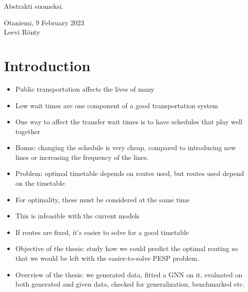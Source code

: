 \documentclass[english, 12pt, a4paper, sci, utf8, a-2b, online]{aaltothesis}
\date{9 February 2023}
\begin{document}
\makecoverpage
\makecopyrightpage
\clearpage

\begin{abstractpage}[english]
    \abstracttext{}
\end{abstractpage}


\newpage
{}
\date{9.2.2023}
\begin{abstractpage}[finnish]
    Abstrakti suomeksi.
\end{abstractpage}


\newpage


\dothesispagenumbering{}


\vspace{5cm}
Otaniemi, 9 February 2023\\

\vspace{5mm}
{\hfill Leevi Rönty \hspace{1cm}}

\newpage
\thesistableofcontents

\cleardoublepage
\section{Introduction}
\label{sec:intro}
\begin{itemize}
    \item Public transportation affects the lives of many
    \item Low wait times are one component of a good transportation system
    \item One way to affect the transfer wait times is to have schedules that play well together
    \item Bonus: changing the schedule is very cheap, compared to introducing new lines or increasing the frequency of the lines.
    \item Problem: optimal timetable depends on routes used, but routes used depend on the timetable
    \item For optimality, these must be considered at the same time
    \item This is infeasible with the current models
    \item If routes are fixed, it's easier to solve for a good timetable
    \item Objective of the thesis: study how we could predict the optimal routing so that we would be left with the easier-to-solve PESP problem.
    \item Overview of the thesis: we generated data, fitted a GNN on it, evaluated on both generated and given data, checked for generalization, benchmarked etc.
\end{itemize}
\end{document}
